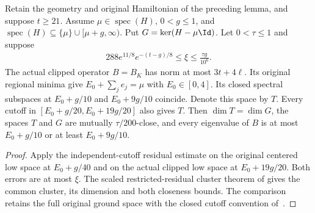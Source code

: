 \begin{lemma}
    \label{lem:five_region_independent_scaled_cluster}
    \leanok
    Retain the geometry and original Hamiltonian of the preceding lemma,
    and suppose $t\ge21$. Assume $\mu\in\operatorname{spec}(H)$,
    $0<g\le1$, and
    $\operatorname{spec}(H)\subseteq\{\mu\}\cup[\mu+g,\infty)$.
    Put $G=\ker(H-\mu\Id)$. Let $0<\tau\le1$ and suppose
    \begin{align}
        288e^{11/8}e^{-(t-g)/8}\le\xi\le\frac{\tau g}{10^6}.
    \end{align}
    The actual clipped operator $B=B_K$ has norm at most $3t+4\ell$.
    Its original regional minima give $E_0+\sum_j e_j=\mu$ with
    $E_0\in[0,4]$. Its closed spectral subspaces at $E_0+g/10$ and
    $E_0+9g/10$ coincide. Denote this space by $T$.
    Every cutoff in $[E_0+g/20,E_0+19g/20]$ also gives $T$.
    Then $\dim T=\dim G$, the spaces $T$ and $G$ are mutually
    $\tau/200$-close, and every eigenvalue of $B$ is at most $E_0+g/10$
    or at least $E_0+9g/10$.
\end{lemma}
\begin{proof}\leanok
    Apply the independent-cutoff residual estimate on the original
    centered low space at $E_0+g/40$ and on the actual clipped low space
    at $E_0+19g/20$. Both errors are at most $\xi$.
    The scaled restricted-residual cluster theorem of
    \cite[``A low cluster with a scaled projection error'']{QICLean2026Blueprint}
    gives the common cluster, its dimension and both closeness bounds.
    The comparison retains the full original ground space with the closed
    cutoff convention of~\cite{gap:alvv16_spectral_projector_boundary}.
\end{proof}
